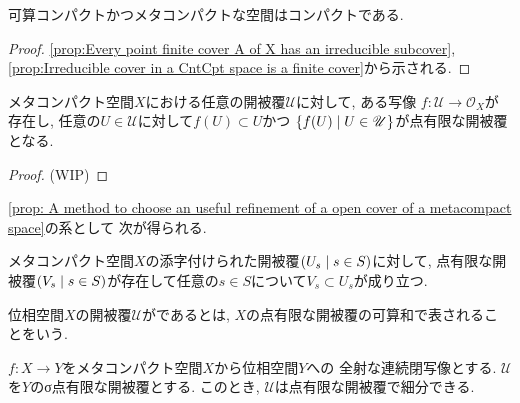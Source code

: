 \documentclass[uplatex, dvipdfmx, a4paper, 12pt, class=jsbook, crop=false]{standalone}
\begin{document}
\begin{proposition}
	\label{prop:CntCpt + MetaCpt > Cpt}
	可算コンパクトかつメタコンパクトな空間はコンパクトである.
\end{proposition}

\begin{proof} 
	\cref{prop:Every point finite cover A of X has an irreducible subcover}, 
	\cref{prop:Irreducible cover in a CntCpt space is a finite cover}から示される.
\end{proof}

\begin{proposition}
	\label{prop: A method to choose an useful refinement of a open cover of a metacompact space}
	メタコンパクト空間$ X $における任意の開被覆$ \mathscr{U} $に対して, ある写像
	$ f \colon \mathscr{U} \to \mathcal{O}_X $が存在し, 
	任意の$ U \in \mathscr{U} $に対して$ f(U) \subset U $かつ
	$ \setcomp{f(U)}{U \in \mathscr{U}} $が点有限な開被覆となる.
\end{proposition}

\begin{proof}
	(WIP)
\end{proof}

\cref{prop: A method to choose an useful refinement of a open cover of a metacompact space}の系として
次が得られる.
\begin{corollary}
	メタコンパクト空間$ X $の添字付けられた開被覆$ \setfamily{U_s}{s \in S} $に対して,
	点有限な開被覆$ \setfamily{V_s}{s \in S} $が存在して任意の$ s \in S $について$ V_s \subset U_s $が成り立つ.
\end{corollary}

\begin{definition}
	位相空間$ X $の開被覆$ \mathscr{U} $がであるとは, 
	$ X $の点有限な開被覆の可算和で表されることをいう.
\end{definition}

\begin{proposition}
	\label{prop: Every sigma-point-finite open covering of the closed image of a MetaCpt space has point a finite refinement}
	$ f \colon X \to Y $をメタコンパクト空間$ X $から位相空間$ Y $への
	全射な連続閉写像とする.
	$ \mathscr{U} $を$ Y $のσ点有限な開被覆とする.
	このとき, $ \mathscr{U} $は点有限な開被覆で細分できる.
\end{proposition}
\end{document}
